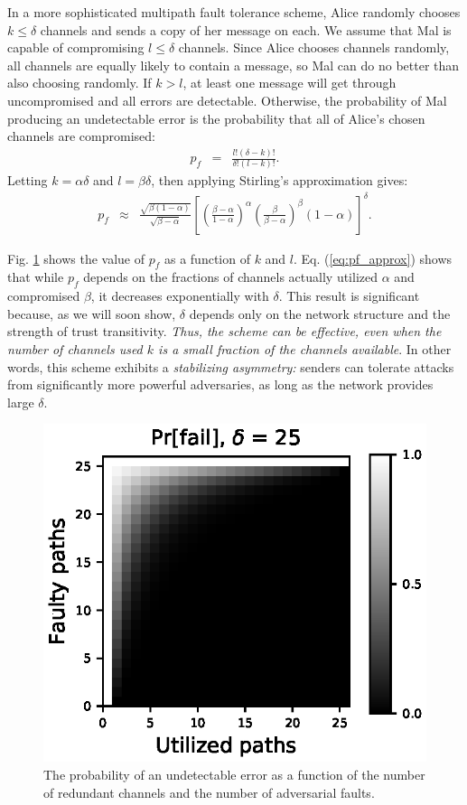 \documentclass[10pt,letterpaper]{article}
\newcommand{\beq}{\begin{eqnarray}}
\newcommand{\eeq}{\end{eqnarray}}
\begin{document}
In a more sophisticated multipath fault tolerance scheme,
Alice randomly chooses $k \leq \delta$ channels and sends a copy of
her message on each.
We assume that Mal is capable of compromising $l \leq \delta$ channels.
Since Alice chooses channels randomly,
all channels are equally likely to contain a message,
so Mal can do no better than also choosing randomly.
If $k > l$, at least one message will get through uncompromised and all
errors are detectable.
Otherwise, the probability of Mal producing an undetectable error is
the probability that all of Alice's chosen channels are compromised:
\beq
\label{eq:pf}
p_f &=& \frac{l!(\delta-k)!}{\delta!(l-k)!}.
\eeq
Letting $k=\alpha \delta$ and $l=\beta \delta$, then applying Stirling's
approximation gives:
\begin{eqnarray}
\label{eq:pf_approx}
p_f &\approx&
\frac{\sqrt{\beta(1-\alpha)}}{\sqrt{\beta-\alpha}}
\left[
    \left( \frac{\beta-\alpha}{1-\alpha} \right)^{\alpha}
    \left( \frac{\beta}{\beta-\alpha} \right)^{\beta}
    (1-\alpha)
\right]^{\delta}.
\end{eqnarray}

Fig. \ref{fig:pfail} shows the value of $p_f$
as a function of $k$ and $l$.
Eq. (\ref{eq:pf_approx}) shows that while $p_f$
depends on the fractions of
channels actually utilized $\alpha$ and compromised $\beta$,
it decreases exponentially with $\delta$.
This result is significant because,
as we will soon show, $\delta$
depends only on the network structure
and the strength of trust transitivity.
{\em Thus, the scheme can be effective, even when the number of channels used
$k$ is a small fraction of the channels available}.
In other words, this scheme exhibits a {\em stabilizing asymmetry:}
senders can tolerate attacks from significantly more powerful
adversaries,
as long as the network provides large $\delta$.

\begin{figure}[!h]
\centerline{\includegraphics{fig-perror}}
\caption{
The probability of an undetectable error as a function of the number of
redundant channels and the number of adversarial faults.
}
\label{fig:pfail}
\end{figure}
\end{document}
